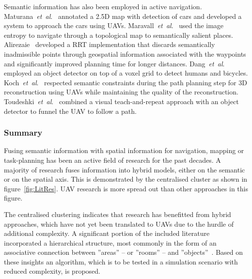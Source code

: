 \documentclass[twocolumn,letterpaper]{IEEEAerospaceCLS}  %
\newcommand{\abbreviation}[1]{\emph{#1}.}
\newcommand{\etal}{\abbreviation{et~al}}
\begin{document}
Semantic information has also been employed in active navigation. Maturana~\etal~\cite{maturana_looking_2017} annotated a 2.5D map with detection of cars and developed a system to approach the cars using UAVs. Maravall~\etal~\cite{maravall_navigation_2017} used the image entropy to navigate through a topological map to semantically salient places. Alirezaie~\cite{alirezaie_exploiting_2017} developed a RRT implementation that discards semantically inadmissible points through geospatial information associated with the waypoints and significantly improved planning time for longer distances. Dang~\etal~\cite{dang_autonomous_2018} employed an object detector on top of a voxel grid to detect humans and bicycles. Koch~\etal~\cite{koch_automatic_2019} respected semantic constraints during the path planning step for 3D reconstruction using UAVs while maintaining the quality of the reconstruction.
Toudeshki~\etal~\cite{toudeshki_robust_2018} combined a visual teach-and-repeat approach with an object detector to funnel the UAV to follow a path.
\subsubsection{Summary} \label{sssec:ResLitSum}
Fusing semantic information with spatial information for navigation, mapping or task-planning has been an active field of research for the past decades. A majority of research fuses information into hybrid models, either on the semantic or on the spatial axis. This is demonstrated by the centralised cluster as shown in figure~\ref{fig:LitRes}. UAV research is more spread out than other approaches in this figure.

The centralised clustering indicates that research has benefitted from hybrid approaches, which have not yet been translated to UAVs due to the hurdle of additional complexity. A significant portion of the included literature incorporated a hierarchical structure, most commonly in the form of an associative connection between ''areas'' -- or ''rooms'' -- and ''objects''~\cite{galindo_robot_2008,alirezaie_exploiting_2017,zhang_hierarchical_2019,chaplot_object_2020,tenorth_knowrob-map_2010,borkowski_towards_2010,kuipers_spatial_2000}. Based on these insights an algorithm, which is to be tested in a simulation scenario with reduced complexity, is proposed.
\end{document}

